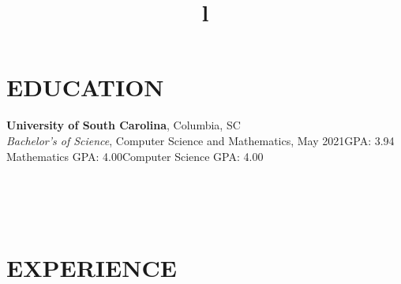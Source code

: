 \documentclass[margin]{res}
\begin{document}
\begin{resume}

\section{EDUCATION}
\textbf{University of South Carolina}, Columbia, SC\\
{\sl Bachelor's of Science}, Computer Science and Mathematics, May 2021\hfill GPA: 
3.94\\
Mathematics GPA: 4.00\hfill Computer Science GPA: 4.00




\begin{format}
\title{l}\\
\\
\body\\
\end{format}

\section{EXPERIENCE}


\end{resume}
\end{document}
